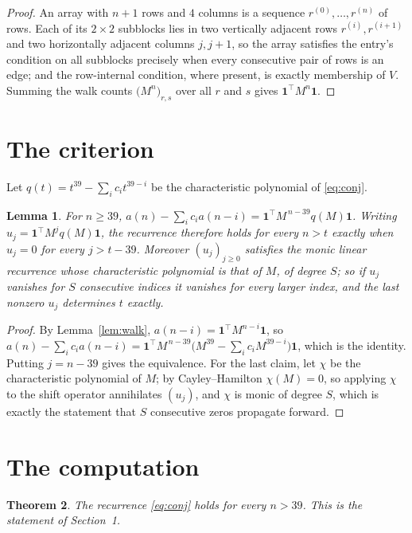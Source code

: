 \documentclass[11pt,a4paper]{article}
\theoremstyle{plain}
\newtheorem{theorem}{Theorem}
\newtheorem{lemma}[theorem]{Lemma}
\theoremstyle{definition}
\begin{document}
\begin{proof}
An array with $n+1$ rows and $4$ columns is a sequence $r^{(0)},\dots,r^{(n)}$ of
rows. Each of its $2\times2$ subblocks lies in two vertically adjacent rows
$r^{(i)},r^{(i+1)}$ and two horizontally adjacent columns $j,j+1$, so the array satisfies
the entry's condition on all subblocks precisely when every consecutive pair of rows is an
edge; and the row-internal condition, where present, is exactly membership of $V$. Summing
the walk counts $\bigl(M^{n}\bigr)_{r,s}$ over all $r$ and $s$ gives
$\mathbf{1}^{\!\top}M^{n}\mathbf{1}$.
\end{proof}

\section{The criterion}

Let $q(t)=t^{39}-\sum_i c_i t^{39-i}$ be the characteristic polynomial of
\eqref{eq:conj}.

\begin{lemma}\label{lem:crit}
For $n\ge39$,
$a(n)-\sum_i c_i a(n-i)=\mathbf{1}^{\!\top}M^{\,n-39}q(M)\mathbf{1}$. Writing
$u_j=\mathbf{1}^{\!\top}M^{j}q(M)\mathbf{1}$, the recurrence therefore holds for every
$n>t$ exactly when $u_j=0$ for every $j>t-39$. Moreover $(u_j)_{j\ge0}$ satisfies the
monic linear recurrence whose characteristic polynomial is that of $M$, of degree $S$; so
if $u_j$ vanishes for $S$ consecutive indices it vanishes for every larger index, and the
last nonzero $u_j$ determines $t$ exactly.
\end{lemma}

\begin{proof}
By Lemma~\ref{lem:walk}, $a(n-i)=\mathbf{1}^{\!\top}M^{n-i}\mathbf{1}$, so
$a(n)-\sum_i c_i a(n-i)
=\mathbf{1}^{\!\top}M^{\,n-39}\bigl(M^{39}-\sum_i c_i M^{39-i}\bigr)
\mathbf{1}$, which is the identity. Putting $j=n-39$ gives the equivalence. For the
last claim, let $\chi$ be the characteristic polynomial of $M$; by Cayley--Hamilton
$\chi(M)=0$, so applying $\chi$ to the shift operator annihilates $(u_j)$, and $\chi$ is
monic of degree $S$, which is exactly the statement that $S$ consecutive zeros propagate
forward.
\end{proof}

\section{The computation}

\begin{theorem}
The recurrence \eqref{eq:conj} holds for every $n>39$. This is the statement of
Section~1.
\end{theorem}
\end{document}
